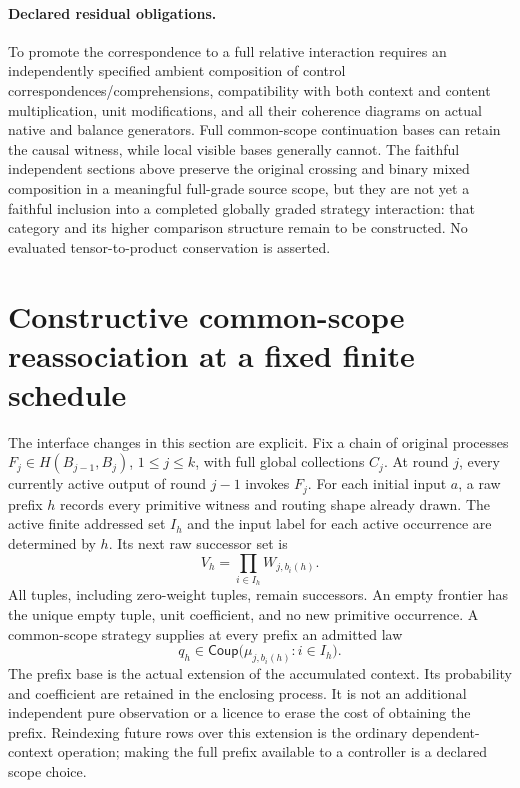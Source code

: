 \documentclass[11pt]{article}
\begin{document}
\paragraph{Declared residual obligations.} To promote the correspondence to a full relative interaction requires an independently specified ambient composition of control correspondences/comprehensions, compatibility with both context and content multiplication, unit modifications, and all their coherence diagrams on actual native and balance generators. Full common-scope continuation bases can retain the causal witness, while local visible bases generally cannot. The faithful independent sections above preserve the original crossing and binary mixed composition in a meaningful full-grade source scope, but they are not yet a faithful inclusion into a completed globally graded strategy interaction: that category and its higher comparison structure remain to be constructed. No evaluated tensor-to-product conservation is asserted.

\section{Constructive common-scope reassociation at a fixed finite schedule}
The interface changes in this section are explicit. Fix a chain of original processes $F_j\in H(B_{j-1},B_j)$, $1\leq j\leq k$, with full global collections $C_j$. At round $j$, every currently active output of round $j-1$ invokes $F_j$. For each initial input $a$, a raw prefix $h$ records every primitive witness and routing shape already drawn. The active finite addressed set $I_h$ and the input label for each active occurrence are determined by $h$. Its next raw successor set is
\[
 V_h=\prod_{i\in I_h}W_{j,b_i(h)}.
\]
All tuples, including zero-weight tuples, remain successors. An empty frontier has the unique empty tuple, unit coefficient, and no new primitive occurrence. A common-scope strategy supplies at every prefix an admitted law
\[
 q_h\in\mathsf{Coup}\bigl(\mu_{j,b_i(h)}:i\in I_h\bigr).
\]
The prefix base is the actual extension of the accumulated context. Its probability and coefficient are retained in the enclosing process. It is not an additional independent pure observation or a licence to erase the cost of obtaining the prefix. Reindexing future rows over this extension is the ordinary dependent-context operation; making the full prefix available to a controller is a declared scope choice.
\end{document}

